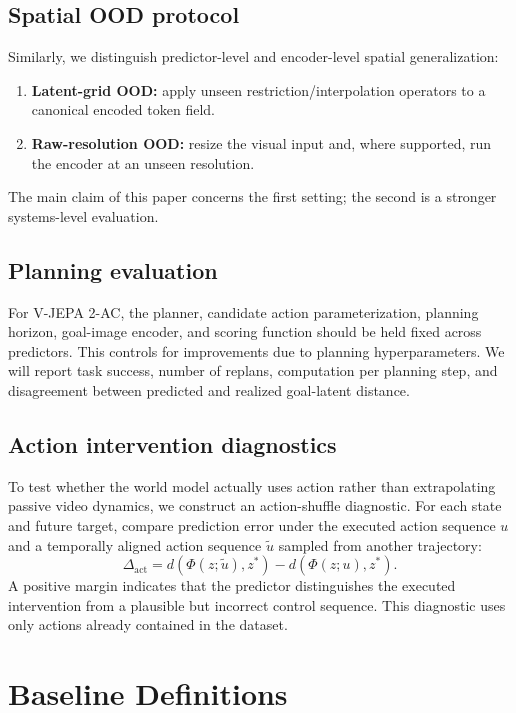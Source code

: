 \documentclass{article}
\theoremstyle{plain}
\theoremstyle{definition}
\theoremstyle{remark}
\newcommand{\PhiOp}{\Phi}
\begin{document}
\subsection{Spatial OOD protocol}
Similarly, we distinguish predictor-level and encoder-level spatial generalization:
\begin{enumerate}
    \item \textbf{Latent-grid OOD:} apply unseen restriction/interpolation operators to a canonical encoded token field.
    \item \textbf{Raw-resolution OOD:} resize the visual input and, where supported, run the encoder at an unseen resolution.
\end{enumerate}
The main claim of this paper concerns the first setting; the second is a stronger systems-level evaluation.

\subsection{Planning evaluation}
For V-JEPA 2-AC, the planner, candidate action parameterization, planning horizon, goal-image encoder, and scoring function should be held fixed across predictors. This controls for improvements due to planning hyperparameters. We will report task success, number of replans, computation per planning step, and disagreement between predicted and realized goal-latent distance.

\subsection{Action intervention diagnostics}
To test whether the world model actually uses action rather than extrapolating passive video dynamics, we construct an action-shuffle diagnostic. For each state and future target, compare prediction error under the executed action sequence $u$ and a temporally aligned action sequence $\widetilde{u}$ sampled from another trajectory:
\begin{equation}
\Delta_{\mathrm{act}}
=
 d(\PhiOp(z;\widetilde{u}),z^*)
-
 d(\PhiOp(z;u),z^*).
\end{equation}
A positive margin indicates that the predictor distinguishes the executed intervention from a plausible but incorrect control sequence. This diagnostic uses only actions already contained in the dataset.

\section{Baseline Definitions}
\label{app:baselines}
\end{document}
